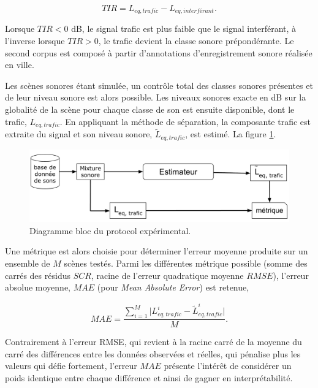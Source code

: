 \begin{equation}
TIR = L_{eq,trafic} - L_{eq,interférant}.
\end{equation}

Lorsque $TIR < 0$ dB, le signal trafic est plus faible que le signal interférant, à l'inverse lorsque $TIR>0$, le trafic devient la classe sonore prépondérante.
Le second corpus est composé à partir d'annotations d'enregistrement sonore réalisée en ville. 


Les scènes sonores étant simulée, un contrôle total des classes sonores présentes et de leur niveau sonore est alors possible. Les niveaux sonores exacte en dB sur la globalité de la scène pour chaque classe de son est ensuite disponible, dont le trafic, $L_{eq,trafic}$. En appliquant la méthode de séparation, la composante trafic est extraite du signal et son niveau sonore, $\tilde{L}_{eq,trafic}$, est estimé. La figure \ref{fig:diagramBlocProtocol}.

\begin{figure}[t]
\centering
\includegraphics[width=0.7\linewidth]{./figures/NMF/Bloc_diagram_estimateur_FR.pdf}
\caption{Diagramme bloc du protocol expérimental.}
\label{fig:diagramBlocProtocol}
\end{figure}


Une métrique est alors choisie pour déterminer l'erreur moyenne produite sur un ensemble de $M$ scènes testés. Parmi les différentes métrique possible (somme des carrés des résidus $SCR$, racine de l'erreur quadratique moyenne $RMSE$), l'erreur absolue moyenne, $MAE$ (pour \textit{Mean Absolute Error}) est retenue,  

\begin{equation}
MAE = \frac{\sum_{i = 1}^{M} \vert L_{eq, trafic}^i - \tilde{L}_{eq, trafic}^i \vert}{M}.
\end{equation}

Contrairement à l'erreur RMSE, qui revient à la racine carré de la moyenne du carré des différences entre les données observées et réelles, qui pénalise plus les valeurs qui défie fortement, l'erreur $MAE$ présente l'intérêt de considérer un poids identique entre chaque différence et ainsi de gagner en interprétabilité.\\


